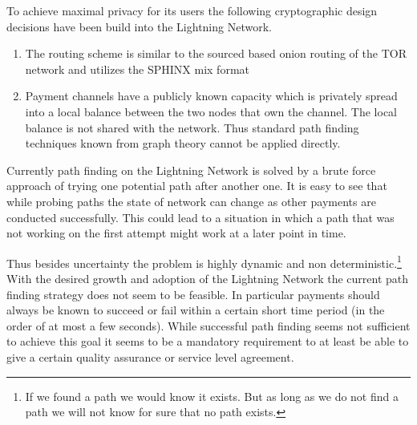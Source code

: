 \documentclass[a4paper]{paper}
\begin{document}
To achieve maximal privacy for its users the following cryptographic design decisions have been build into the Lightning Network.
\begin{enumerate}
\item The routing scheme is similar to the sourced based onion routing of the TOR network and utilizes the SPHINX mix format \cite{danezis2009sphinx}
\item Payment channels have a publicly known capacity which is privately spread into a local balance between the two nodes that own the channel. The local balance is not shared with the network. Thus standard path finding techniques known from graph theory cannot be applied directly.
\end{enumerate}

Currently path finding on the Lightning Network is solved by a brute force approach of trying one potential path after another one.
It is easy to see that while probing paths the state of network can change as other payments are conducted successfully.
This could lead to a situation in which a path that was not working on the first attempt might work at a later point in time.

Thus besides uncertainty the problem is highly dynamic and non deterministic.\footnote{If we found a path we would know it exists. But as long as we do not find a path we will not know for sure that no path exists.}
With the desired growth and adoption of the Lightning Network the current path finding strategy does not seem to be feasible.
In particular payments should always be known to succeed or fail within a certain short time period (in the order of at most a few seconds).
While successful path finding seems not sufficient to achieve this goal it seems to be a mandatory requirement to at least be able to give a certain quality assurance or service level agreement.
\end{document}
